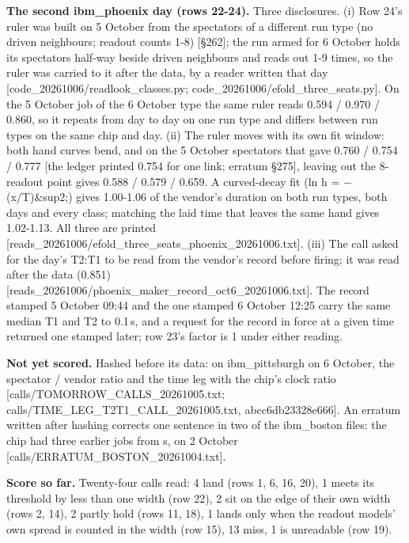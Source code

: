\documentclass[11pt]{article}
\begin{document}
\textbf{The second ibm\_phoenix day (rows 22-24).} Three disclosures. (i) Row 24's ruler was built on 5 October from the spectators of a different run type (no driven neighbours; readout counts 1-8) {[}\S{}262{]}; the run armed for 6 October holds its spectators half-way beside driven neighbours and reads out 1-9 times, so the ruler was carried to it after the data, by a reader written that day {[}code\_20261006/readlook\_classes.py; code\_20261006/efold\_three\_seats.py{]}. On the 5 October job of the 6 October type the same ruler reads 0.594 / 0.970 / 0.860, so it repeats from day to day on one run type and differs between run types on the same chip and day. (ii) The ruler moves with its own fit window: both hand curves bend, and on the 5 October spectators that gave 0.760 / 0.754 / 0.777 {[}the ledger printed 0.754 for one link; erratum \S{}275{]}, leaving out the 8-readout point gives 0.588 / 0.579 / 0.659. A curved-decay fit (ln h = \(-\)(x/T)\&sup2;) gives 1.00-1.06 of the vendor's duration on both run types, both days and every class; matching the laid time that leaves the same hand gives 1.02-1.13. All three are printed {[}reads\_20261006/efold\_three\_seats\_phoenix\_20261006.txt{]}. (iii) The call asked for the day's T2:T1 to be read from the vendor's record before firing; it was read after the data (0.851) {[}reads\_20261006/phoenix\_maker\_record\_oct6\_20261006.txt{]}. The record stamped 5 October 09:44 and the one stamped 6 October 12:25 carry the same median T1 and T2 to 0.1\,\textmu s, and a request for the record in force at a given time returned one stamped later; row 23's factor is 1 under either reading.

\textbf{Not yet scored.} Hashed before its data: on ibm\_pittsburgh on 6 October, the spectator / vendor ratio and the time leg with the chip's clock ratio {[}calls/TOMORROW\_CALLS\_20261005.txt; calls/TIME\_LEG\_T2T1\_CALL\_20261005.txt, abcc6db23328e666{]}. An erratum written after hashing corrects one sentence in two of the ibm\_boston files: the chip had three earlier jobs from \textmu s, on 2 October {[}calls/ERRATUM\_BOSTON\_20261004.txt{]}.

\textbf{Score so far.} Twenty-four calls read: 4 land (rows 1, 6, 16, 20), 1 meets its threshold by less than one width (row 22), 2 sit on the edge of their own width (rows 2, 14), 2 partly hold (rows 11, 18), 1 lands only when the readout models' own spread is counted in the width (row 15), 13 miss, 1 is unreadable (row 19).
\end{document}
